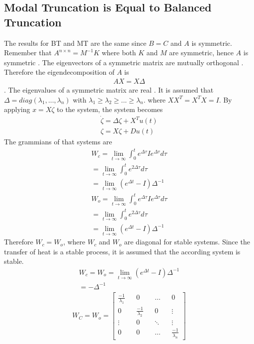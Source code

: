 \subsection{Modal Truncation is Equal to Balanced Truncation}
The results for BT and MT are the same since \(B = C\) and \(A\) is symmetric.
Remember that \(A^{n\times n} = M^{-1}K\) where both \(K\) and \(M\) are symmetric, hence \(A\) is symmetric \cite{170372}.
The eigenvectors of a symmetric matrix are mutually orthogonal \cite{Zhang}.
Therefore the eigendecomposition of  \(A\) is
\begin{gather}
AX = X\Delta
\end{gather}.
The eigenvalues of a symmetric matrix are real .
It is assumed that \(\Delta = diag(\lambda_1, ..., \lambda_n)\) with \(\lambda_1 \geq \lambda_2 \geq ... \geq \lambda_n\).
where \(XX^T = X^TX = I\).
By applying \(x = X\zeta\) to the system, the system becomes
\begin{gather}
\dot{\zeta} = \Delta \zeta + X^{T}u(t) \label{sys-zeta1}\\
\zeta = X\zeta + Du(t) \label{sys-zeta2}
\end{gather}
The grammians of that systems are
\begin{gather}
W_c = \lim_{t \to \infty} \int_{0}^{t} e^{\Delta\tau}Ie^{\Delta\tau}d\tau \label{gramc} \\
= \lim_{t \to \infty} \int_{0}^{t} e^{2\Delta\tau}d\tau \\
= \lim_{t \to \infty} (e^{\Delta t} - I)\Delta^{-1} \\
W_o = \lim_{t \to \infty} \int_{0}^{t} e^{\Delta\tau}Ie^{\Delta\tau}d\tau \label{gramo} \\
= \lim_{t \to \infty} \int_{0}^{t} e^{2\Delta\tau}d\tau \\
= \lim_{t \to \infty} (e^{\Delta t} - I)\Delta^{-1}
\end{gather}
Therefore \(W_c = W_o\), where \(W_c\) and \(W_o\) are diagonal for stable systems.
Since the transfer of heat is a stable process, it is assumed that the according system is stable.
\begin{gather}
W_c = W_o = \lim_{t \to \infty} (e^{\Delta t} - I)\Delta^{-1} \\
= -\Delta^{-1} 
\end{gather}
\cite{658289}
\begin{gather}
W_C = W_o = \begin{bmatrix}
\frac{-1}{\lambda_1} && 0 && \hdots && 0 \\
0 && \frac{-1}{\lambda_2}&& 0 && \vdots \\
\vdots && 0 && \ddots && \vdots \\
0 && 0 && \hdots && \frac{-1}{\lambda_n}
\end{bmatrix}
\end{gather}
